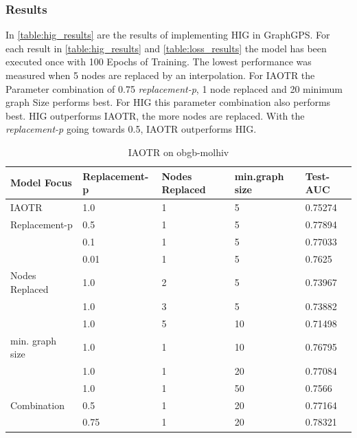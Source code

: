 \subsubsection{Results}
In \autoref{table:hig_results} are the results of implementing HIG in GraphGPS. For each result in \autoref{table:hig_results} and \autoref{table:loss_results} the model has been executed once with 100 Epochs of Training. The lowest performance was measured when 5 nodes are replaced by an interpolation. For IAOTR the Parameter combination of 0.75 \emph{replacement-p}, 1 node replaced and 20 minimum graph Size performs best. For HIG  this parameter combination also performs best. HIG outperforms IAOTR, the more nodes are replaced. With the \emph{replacement-p} going towards 0.5, IAOTR outperforms HIG.
\begin{table}[ht!]
    \centering
    \begin{tabular}{@{}lllll@{}}
        \toprule
        Model Focus     & Replacement-p & Nodes Replaced & min.graph size & Test-AUC \\ \midrule
        IAOTR           & 1.0           & 1              & 5              & 0.75274  \\
        Replacement-p   & 0.5           & 1              & 5              & 0.77894  \\
                        & 0.1           & 1              & 5              & 0.77033  \\
                        & 0.01          & 1              & 5              & 0.7625   \\
        Nodes Replaced  & 1.0           & 2              & 5              & 0.73967  \\
                        & 1.0           & 3              & 5              & 0.73882  \\
                        & 1.0           & 5              & 10             & 0.71498  \\
        min. graph size & 1.0           & 1              & 10             & 0.76795  \\
                        & 1.0           & 1              & 20             & 0.77084  \\
                        & 1.0           & 1              & 50             & 0.7566   \\
        Combination     & 0.5           & 1              & 20             & 0.77164  \\
                        & 0.75          & 1              & 20             & 0.78321  \\ \bottomrule
    \end{tabular}
    \caption{IAOTR on obgb-molhiv}
    \label{table:loss_results}
\end{table}

